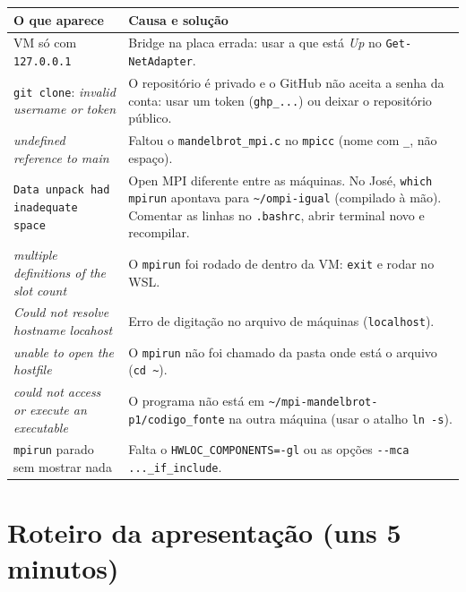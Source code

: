 \documentclass[a4paper,11pt]{article}
\begin{document}
\begin{center}
\begin{tabularx}{\textwidth}{|X|X|}
\hline
\textbf{O que aparece} & \textbf{Causa e solução} \\ \hline
VM só com \texttt{127.0.0.1} & Bridge na placa errada: usar a que está \textit{Up} no \texttt{Get-NetAdapter}. \\ \hline
\texttt{git clone}: \textit{invalid username or token} & O repositório é privado e o GitHub não aceita a senha da conta: usar um token (\texttt{ghp\_...}) ou deixar o repositório público. \\ \hline
\textit{undefined reference to main} & Faltou o \texttt{mandelbrot\_mpi.c} no \texttt{mpicc} (nome com \texttt{\_}, não espaço). \\ \hline
\texttt{Data unpack had inadequate space} & Open MPI diferente entre as máquinas. No José, \texttt{which mpirun} apontava para \texttt{\textasciitilde/ompi-igual} (compilado à mão). Comentar as linhas no \texttt{.bashrc}, abrir terminal novo e recompilar. \\ \hline
\textit{multiple definitions of the slot count} & O \texttt{mpirun} foi rodado de dentro da VM: \texttt{exit} e rodar no WSL. \\ \hline
\textit{Could not resolve hostname locahost} & Erro de digitação no arquivo de máquinas (\texttt{localhost}). \\ \hline
\textit{unable to open the hostfile} & O \texttt{mpirun} não foi chamado da pasta onde está o arquivo (\texttt{cd \textasciitilde}). \\ \hline
\textit{could not access or execute an executable} & O programa não está em \texttt{\textasciitilde/mpi-mandelbrot-p1/codigo\_fonte} na outra máquina (usar o atalho \texttt{ln -s}). \\ \hline
\texttt{mpirun} parado sem mostrar nada & Falta o \texttt{HWLOC\_COMPONENTS=-gl} ou as opções \texttt{-{}-mca ...\_if\_include}. \\ \hline
\end{tabularx}
\end{center}

\section{Roteiro da apresentação (uns 5 minutos)}
\end{document}
